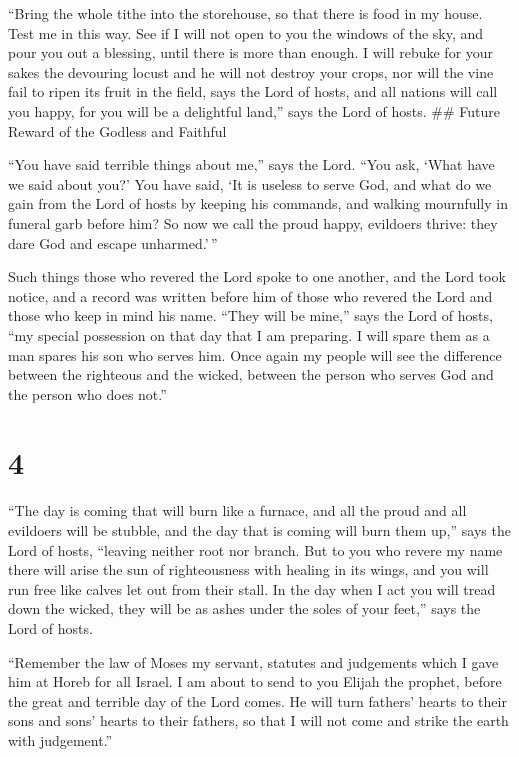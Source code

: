  ``Bring the whole tithe into the storehouse, so that there
is food in my house. Test me in this way. See if I will not open to you
the windows of the sky, and pour you out a blessing, until there is more
than enough.  I will rebuke for your sakes the devouring
locust and he will not destroy your crops, nor will the vine fail to
ripen its fruit in the field, says the Lord of hosts,  and
all nations will call you happy, for you will be a delightful land,''
says the Lord of hosts.  \#\# Future Reward of the Godless
and Faithful

``You have said terrible things about me,'' says the Lord. ``You ask,
`What have we said about you?'  You have said, `It is
useless to serve God, and what do we gain from the Lord of hosts by
keeping his commands, and walking mournfully in funeral garb before him?
 So now we call the proud happy, evildoers thrive: they
dare God and escape unharmed.'\,''

 Such things those who revered the Lord spoke to one
another, and the Lord took notice, and a record was written before him
of those who revered the Lord and those who keep in mind his name.
 ``They will be mine,'' says the Lord of hosts, ``my
special possession on that day that I am preparing. I will spare them as
a man spares his son who serves him.  Once again my people
will see the difference between the righteous and the wicked, between
the person who serves God and the person who does not.''

\hypertarget{section-3}{%
\section{4}\label{section-3}}

 ``The day is coming that will burn like a furnace, and all
the proud and all evildoers will be stubble, and the day that is coming
will burn them up,'' says the Lord of hosts, ``leaving neither root nor
branch.  But to you who revere my name there will arise the
sun of righteousness with healing in its wings, and you will run free
like calves let out from their stall.  In the day when I act
you will tread down the wicked, they will be as ashes under the soles of
your feet,'' says the Lord of hosts.

 ``Remember the law of Moses my servant, statutes and
judgements which I gave him at Horeb for all Israel.  I am
about to send to you Elijah the prophet, before the great and terrible
day of the Lord comes.  He will turn fathers' hearts to
their sons and sons' hearts to their fathers, so that I will not come
and strike the earth with judgement.''
